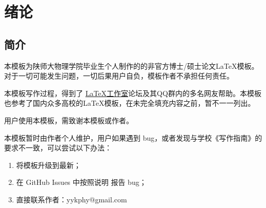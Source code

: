 \chapter{绪论}


\section{简介}

本模板为陕师大物理学院毕业生个人制作的的非官方博士/硕士论文\LaTeX 模板。对于一切可能发生问题，一切后果用户自负，模板作者不承担任何责任。


本模板写作过程，得到了 \href{https://www.latexstudio.net/}{\LaTeX 工作室}论坛及其QQ群内的多名网友帮助。本模板也参考了国内众多高校的\LaTeX 模板，在未完全填充内容之前，暂不一一列出。
    

用户使用本模板，需致谢本模板或作者。

本模板暂时由作者个人维护，用户如果遇到 bug，或者发现与学校《写作指南》的要求不一致，可以尝试以下办法：
\begin{enumerate}
    \item 将模板升级到最新；
    \item 在 GitHub Issues 中按照说明 报告 bug；
    \item 直接联系作者：yykphy@gmail.com 
\end{enumerate}






